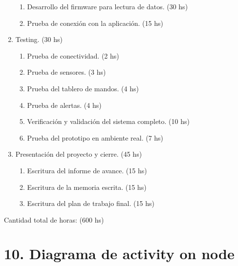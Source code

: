 \documentclass[
11pt, %
]{charter}
\begin{document}
\begin{enumerate}
\begin{enumerate}
	\item Desarrollo del firmware para lectura de datos. (30 hs)
	\item Prueba de conexión con la aplicación. (15 hs)
	\end{enumerate}
\item Testing. (30 hs)
	\begin{enumerate}
	\item Prueba de conectividad. (2 hs)
	\item Prueba de sensores. (3 hs)
	\item Prueba del tablero de mandos. (4 hs)
	\item Prueba de alertas. (4 hs)
	\item Verificación y validación del sistema completo. (10 hs)
	\item Prueba del prototipo en ambiente real. (7 hs)
	\end{enumerate}
\item Presentación del proyecto y cierre. (45 hs)
	\begin{enumerate}
	\item Escritura del informe de avance. (15 hs)
	\item Escritura de la memoria escrita. (15 hs)
	\item Escritura del plan de trabajo final. (15 hs)
	\end{enumerate}
\end{enumerate}

Cantidad total de horas: (600 hs)

\section{10. Diagrama de activity on node}
\label{sec:AoN}




\end{document}
